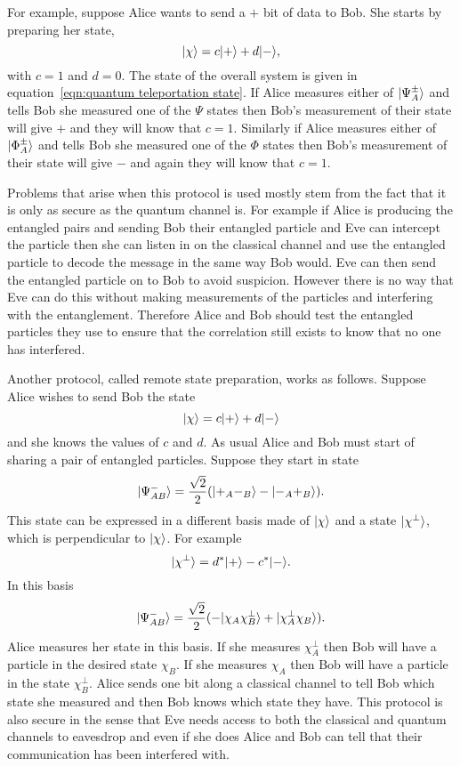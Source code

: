     For example, suppose Alice wants to send a \(+\) bit of data to Bob.
    She starts by preparing her state, 
    \[\vert {\chi} \rangle = c\vert {+} \rangle + d\vert {-} \rangle,\]
    with \(c = 1\) and \(d = 0\).
    The state of the overall system is given in equation~\ref{eqn:quantum teleportation state}.
    If Alice measures either of \(\vert {\Psi^{\pm}_A} \rangle\) and tells Bob she measured one of the \(\Psi\) states then Bob's measurement of their state will give \(+\) and they will know that \(c = 1\).
    Similarly if Alice measures either of \(\vert {\Phi^{\pm}_A} \rangle\) and tells Bob she measured one of the \(\Phi\) states then Bob's measurement of their state will give \(-\) and again they will know that \(c = 1\).
    
    Problems that arise when this protocol is used mostly stem from the fact that it is only as secure as the quantum channel is.
    For example if Alice is producing the entangled pairs and sending Bob their entangled particle and Eve can intercept the particle then she can listen in on the classical channel and use the entangled particle to decode the message in the same way Bob would.
    Eve can then send the entangled particle on to Bob to avoid suspicion.
    However there is no way that Eve can do this without making measurements of the particles and interfering with the entanglement.
    Therefore Alice and Bob should test the entangled particles they use to ensure that the correlation still exists to know that no one has interfered.
    
    Another protocol, called remote state preparation, works as follows.
    Suppose Alice wishes to send Bob the state
    \[\vert {\chi} \rangle = c\vert {+} \rangle + d\vert {-} \rangle\]
    and she knows the values of \(c\) and \(d\).
    As usual Alice and Bob must start of sharing a pair of entangled particles.
    Suppose they start in state
    \[\vert {\Psi_{AB}^-} \rangle = \frac{\sqrt{2}}{2}(\vert {+_A-_B} \rangle - \vert {-_A+_B} \rangle).\]
    This state can be expressed in a different basis made of \(\vert {\chi} \rangle\) and a state \(\vert {\chi^\perp} \rangle\), which is perpendicular to \(\vert {\chi} \rangle\).
    For example
    \[\vert {\chi^\perp} \rangle = d^*\vert {+} \rangle - c^*\vert {-} \rangle.\]
    In this basis
    \[\vert {\Psi^-_{AB}} \rangle = \frac{\sqrt{2}}{2}(-\vert {\chi_A\chi_B^\perp} \rangle + \vert {\chi_A^\perp\chi_B} \rangle).\]
    Alice measures her state in this basis.
    If she measures \(\chi_A^\perp\) then Bob will have a particle in the desired state \(\chi_B\).
    If she measures \(\chi_A\) then Bob will have a particle in the state \(\chi_B^\perp\).
    Alice sends one bit along a classical channel to tell Bob which state she measured and then Bob knows which state they have.
    This protocol is also secure in the sense that Eve needs access to both the classical and quantum channels to eavesdrop and even if she does Alice and Bob can tell that their communication has been interfered with.
    
